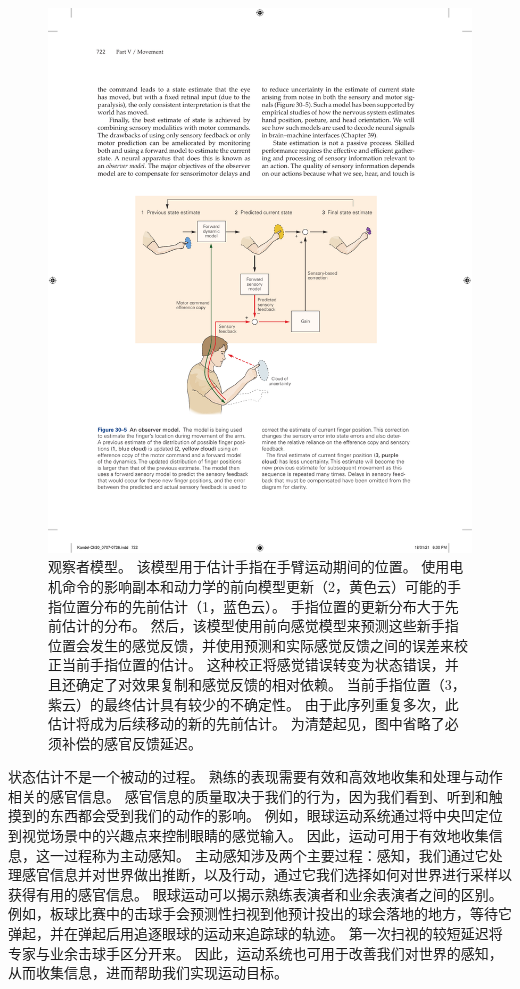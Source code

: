 \begin{figure}[htbp]
	\centering
	\includegraphics[width=0.9\linewidth]{chap30/fig_30_5}
	\caption{观察者模型。 该模型用于估计手指在手臂运动期间的位置。 使用电机命令的影响副本和动力学的前向模型更新（2，黄色云）可能的手指位置分布的先前估计（1，蓝色云）。 手指位置的更新分布大于先前估计的分布。 然后，该模型使用前向感觉模型来预测这些新手指位置会发生的感觉反馈，并使用预测和实际感觉反馈之间的误差来校正当前手指位置的估计。 这种校正将感觉错误转变为状态错误，并且还确定了对效果复制和感觉反馈的相对依赖。 当前手指位置（3，紫云）的最终估计具有较少的不确定性。 由于此序列重复多次，此估计将成为后续移动的新的先前估计。 为清楚起见，图中省略了必须补偿的感官反馈延迟。}
	\label{fig:30_5}
\end{figure}


状态估计不是一个被动的过程。
熟练的表现需要有效和高效地收集和处理与动作相关的感官信息。
感官信息的质量取决于我们的行为，因为我们看到、听到和触摸到的东西都会受到我们的动作的影响。
例如，眼球运动系统通过将中央凹定位到视觉场景中的兴趣点来控制眼睛的感觉输入。
因此，运动可用于有效地收集信息，这一过程称为主动感知。
主动感知涉及两个主要过程：感知，我们通过它处理感官信息并对世界做出推断，以及行动，通过它我们选择如何对世界进行采样以获得有用的感官信息。
眼球运动可以揭示熟练表演者和业余表演者之间的区别。
例如，板球比赛中的击球手会预测性扫视到他预计投出的球会落地的地方，等待它弹起，并在弹起后用追逐眼球的运动来追踪球的轨迹。
第一次扫视的较短延迟将专家与业余击球手区分开来。
因此，运动系统也可用于改善我们对世界的感知，从而收集信息，进而帮助我们实现运动目标。



